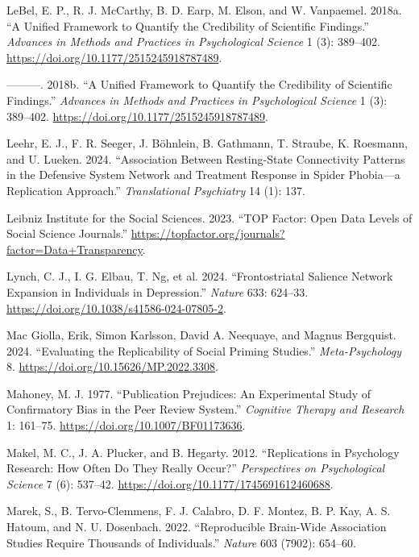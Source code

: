 \documentclass[
  letterpaper,
  DIV=11,
  openany,
  fontsize=12pt,
  parskip=half,
  headings=big,
  numbers=noenddot,
  titlepage=false]{scrreprt}
\newlength{\cslhangindent}
\newenvironment{CSLReferences}[2] %
 {\begin{list}{}{%
  \setlength{\itemindent}{0pt}
  \setlength{\leftmargin}{0pt}
  \setlength{\parsep}{0pt}
  \ifodd #1
   \setlength{\leftmargin}{\cslhangindent}
   \setlength{\itemindent}{-1\cslhangindent}
  \fi
  \setlength{\itemsep}{#2\baselineskip}}}
 {\end{list}}
\begin{document}
\begin{CSLReferences}{1}{0}
LeBel, E. P., R. J. McCarthy, B. D. Earp, M. Elson, and W. Vanpaemel.
2018a. {``A Unified Framework to Quantify the Credibility of Scientific
Findings.''} \emph{Advances in Methods and Practices in Psychological
Science} 1 (3): 389--402.
\url{https://doi.org/10.1177/2515245918787489}.

---------. 2018b. {``A Unified Framework to Quantify the Credibility of
Scientific Findings.''} \emph{Advances in Methods and Practices in
Psychological Science} 1 (3): 389--402.
\url{https://doi.org/10.1177/2515245918787489}.

Leehr, E. J., F. R. Seeger, J. Böhnlein, B. Gathmann, T. Straube, K.
Roesmann, and U. Lueken. 2024. {``Association Between Resting-State
Connectivity Patterns in the Defensive System Network and Treatment
Response in Spider Phobia---a Replication Approach.''}
\emph{Translational Psychiatry} 14 (1): 137.

Leibniz Institute for the Social Sciences. 2023. {``TOP Factor: Open
Data Levels of Social Science Journals.''}
\url{https://topfactor.org/journals?factor=Data+Transparency}.

Lynch, C. J., I. G. Elbau, T. Ng, et al. 2024. {``Frontostriatal
Salience Network Expansion in Individuals in Depression.''}
\emph{Nature} 633: 624--33.
\url{https://doi.org/10.1038/s41586-024-07805-2}.

Mac Giolla, Erik, Simon Karlsson, David A. Neequaye, and Magnus
Bergquist. 2024. {``Evaluating the Replicability of Social Priming
Studies.''} \emph{Meta-Psychology} 8.
\url{https://doi.org/10.15626/MP.2022.3308}.

Mahoney, M. J. 1977. {``Publication Prejudices: An Experimental Study of
Confirmatory Bias in the Peer Review System.''} \emph{Cognitive Therapy
and Research} 1: 161--75. \url{https://doi.org/10.1007/BF01173636}.

Makel, M. C., J. A. Plucker, and B. Hegarty. 2012. {``Replications in
Psychology Research: How Often Do They Really Occur?''}
\emph{Perspectives on Psychological Science} 7 (6): 537--42.
\url{https://doi.org/10.1177/1745691612460688}.

Marek, S., B. Tervo-Clemmens, F. J. Calabro, D. F. Montez, B. P. Kay, A.
S. Hatoum, and N. U. Dosenbach. 2022. {``Reproducible Brain-Wide
Association Studies Require Thousands of Individuals.''} \emph{Nature}
603 (7902): 654--60.


\end{CSLReferences}
\end{document}
